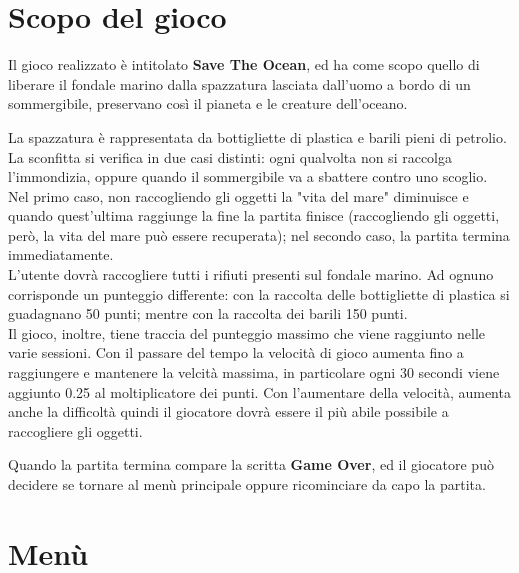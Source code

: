 \documentclass[12pt]{article}
\begin{document}
\section{Scopo del gioco}
Il gioco realizzato è intitolato \textbf{Save The Ocean}, ed ha come scopo quello di liberare il fondale marino dalla spazzatura lasciata dall'uomo a bordo di un sommergibile, preservano così il pianeta e le creature dell'oceano.

La spazzatura è rappresentata da bottigliette di plastica e barili pieni di petrolio.
\\

La sconfitta si verifica in due casi distinti: ogni qualvolta non si raccolga l'immondizia, oppure quando il sommergibile va a sbattere contro uno scoglio. Nel primo caso, non raccogliendo gli oggetti la "vita del mare" diminuisce e quando quest'ultima raggiunge la fine la partita finisce (raccogliendo gli oggetti, però, la vita del mare può essere recuperata); nel secondo caso, la partita termina immediatamente. 
\\

L'utente dovrà raccogliere tutti i rifiuti presenti sul fondale marino. Ad ognuno corrisponde un punteggio differente: con la raccolta delle bottigliette di plastica si guadagnano 50 punti; mentre con la raccolta dei barili 150 punti. 
\\Il gioco, inoltre, tiene traccia del punteggio massimo che viene raggiunto nelle varie sessioni.
Con il passare del tempo la velocità di gioco aumenta fino a raggiungere e mantenere la velcità massima, in particolare ogni 30 secondi viene aggiunto 0.25 al moltiplicatore dei punti. Con l'aumentare della velocità, aumenta anche la difficoltà quindi il giocatore dovrà essere il più abile possibile a raccogliere gli oggetti. 

Quando la partita termina compare la scritta \textbf{Game Over}, ed il giocatore può decidere se tornare al menù principale oppure ricominciare da capo la partita.
\section{Menù}
\end{document}
